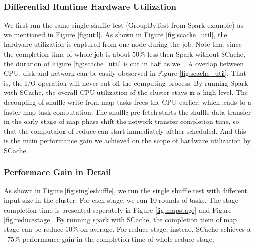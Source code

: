 \subsubsection{Differential Runtime Hardware Utilization} 
We first run the same single shuffle test (GroupByTest from Spark example\cite{sparksource}) as we mentioned in Figure \ref{fig:util}. As shown in Figure \ref{fig:scache_util}, the hardware utilization is captured from one node during the job. Note that since the completion time of whole job is about $50\%$ less then Spark without SCache, the duration of Figure \ref{fig:scache_util} is cut in half as well. A overlap between CPU, disk and network can be easily obeserved in Figure \ref{fig:scache_util}. That is, the I/O operation will never cut off the computing process. By running Spark with SCache, the overall CPU utilization of the cluster stays in a high level. The decoupling of shuffle write from map tasks frees the CPU earlier, which leads to a faster map task computation. The shuffle pre-fetch starts the shuffle data transfer in the early stage of map phase shift the network transfer completion time, so that the computaion of reduce can start immediately afther scheduled. And this is the main performance gain we achieved on the scope of hardware utilization by SCache.

\subsubsection{Performace Gain in Detail}

As shown in Figure \ref{fig:singleshuffle}, we run the single shuffle test with different input size in the cluster. For each stage, we run 10 rounds of tasks. The stage completion time is presented seperately in Figure \ref{fig:mapstage} and Figure \ref{fig:reducestage}. By running spark with SCache, the completion tiem of map stage can be reduce $10\%$ on average. For reduce stage, instead, SCache achieves a ~$75\%$ performance gain in the completion time of whole reduce stage.

